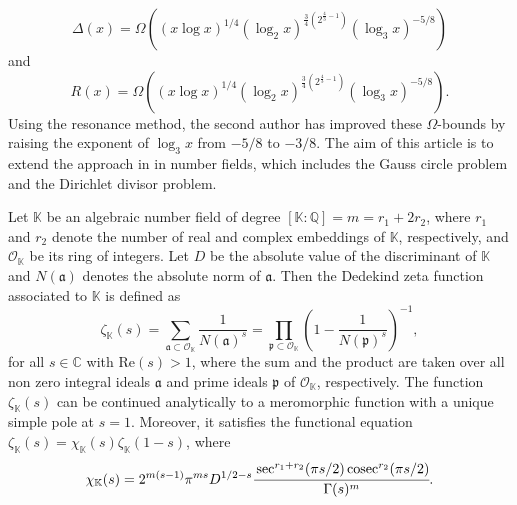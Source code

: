 \documentclass[reqno]{amsart}
\newcommand{\cosec}{\text{cosec}}
\numberwithin{equation}{section}
\theoremstyle{plain}
\begin{document}
	\begin{equation*}
		\Delta(x) = \Omega\left((x\log x)^{1/4} (\log_2 x)^{\frac{3}{4}(2^{\frac{4}{3}-1})}(\log_3 x)^{-5/8}\right)
	\end{equation*}
	and 
		\begin{equation*}
		R(x) = \Omega\left((x\log x)^{1/4} (\log_2 x)^{\frac{3}{4}(2^{\frac{4}{3}-1})}(\log_3 x)^{-5/8}\right).
	\end{equation*}
	Using the resonance method, the second author \cite{K. Mahatab} has improved these $\Omega$-bounds by raising the exponent of $\log_3 x$  from $-5/8$ to $-3/8$. The aim of this article is to extend the approach in \cite{K. Mahatab} in number fields, which includes the Gauss circle problem and the Dirichlet divisor problem.
	
	
	
	Let $\mathbb{K}$ be an algebraic number field of degree $[\mathbb{K}: \mathbb{Q}] =m=r_1+2r_2$, where $r_1$ and $r_2$ denote the number of real and complex embeddings of $\mathbb{K}$, respectively, and $\mathcal{O}_{\mathbb{K}}$ be its ring of integers. Let $D$ be the absolute value of the discriminant of $\mathbb{K}$ and $N(\mathfrak{a})$ denotes the absolute norm of $\mathfrak{a}$. Then the Dedekind zeta function associated to $\mathbb{K}$ is defined as 
	\begin{equation*}
		\zeta_{\mathbb{K}}(s)= \sum_{\mathfrak{a}\subset \mathcal{O}_{\mathbb{K}}} \frac{1}{N(\mathfrak{a})^s} = \prod_{\mathfrak{p}\subset \mathcal{O}_{\mathbb{K}}} \left(1-\frac{1}{N(\mathfrak{p})^s}\right)^{-1} ,
	\end{equation*} 
for all $s\in \mathbb{C}$ with $\text{Re}(s)>1$, 
	where the sum and the product are taken over all non zero integral ideals $\mathfrak{a}$ and prime ideals $\mathfrak{p}$ of  $\mathcal{O}_{\mathbb{K}}$, respectively. The function $\zeta_{\mathbb{K}}(s)$ can be continued analytically to a meromorphic function with a unique simple pole at $s=1$. Moreover, it satisfies the functional equation $\zeta_{\mathbb{K}}(s)= \chi_{\mathbb{K}}(s) \zeta_{\mathbb{K}}(1-s)$, where
	\begin{equation} \label{chi_K(s)}
		\chi_{\mathbb{K}}(s) = 2^{m(s-1)} \pi^{ms} D^{1/2-s} \cfrac{\sec^{r_1+r_2}(\pi s/2)\,\cosec^{r_2}(\pi s/2)}{\Gamma(s)^m}.
	\end{equation}
\end{document}
